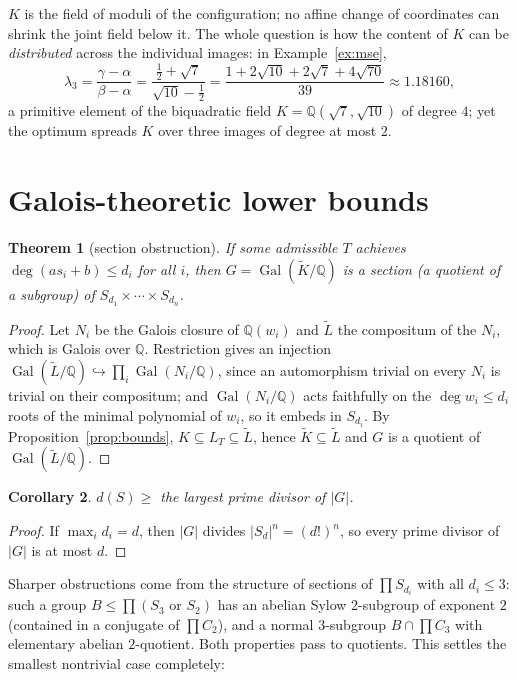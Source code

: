 \documentclass[11pt]{article}
\newtheorem{theorem}{Theorem}
\newtheorem{corollary}[theorem]{Corollary}
\theoremstyle{definition}
\theoremstyle{remark}
\newcommand{\Q}{\mathbb{Q}}
\newcommand{\Gal}{\operatorname{Gal}}
\newcommand{\Kt}{\widetilde{K}}
\begin{document}
$K$ is the field of moduli of the configuration; no affine change of coordinates can shrink
the joint field below it. The whole question is how the content of $K$ can be \emph{distributed}
across the individual images: in Example~\ref{ex:mse},
\begin{equation}\label{eq:lambda}
\lambda_3
= \frac{\gamma - \alpha}{\beta - \alpha}
= \frac{\tfrac12 + \sqrt7}{\sqrt{10} - \tfrac12}
= \frac{1 + 2\sqrt{10} + 2\sqrt7 + 4\sqrt{70}}{39}
\approx 1.18160,
\end{equation}
a primitive element of the biquadratic field $K = \Q(\sqrt7, \sqrt{10})$ of degree $4$; yet
the optimum spreads $K$ over three images of degree at most $2$.

\section{Galois-theoretic lower bounds}\label{sec:lower}

\begin{theorem}[section obstruction]\label{thm:section}
If some admissible $T$ achieves $\deg(a s_i + b) \le d_i$ for all $i$, then $G = \Gal(\Kt/\Q)$
is a \emph{section} (a quotient of a subgroup) of $S_{d_1} \times \cdots \times S_{d_n}$.
\end{theorem}

\begin{proof}
Let $N_i$ be the Galois closure of $\Q(w_i)$ and $\widetilde L$ the compositum of the $N_i$,
which is Galois over $\Q$. Restriction gives an injection
$\Gal(\widetilde L/\Q) \hookrightarrow \prod_i \Gal(N_i/\Q)$, since an automorphism trivial on
every $N_i$ is trivial on their compositum; and $\Gal(N_i/\Q)$ acts faithfully on the
$\deg w_i \le d_i$ roots of the minimal polynomial of $w_i$, so it embeds in $S_{d_i}$. By
Proposition~\ref{prop:bounds}, $K \subseteq L_T \subseteq \widetilde L$, hence
$\Kt \subseteq \widetilde L$ and $G$ is a quotient of $\Gal(\widetilde L/\Q)$.
\end{proof}

\begin{corollary}\label{cor:prime}
$d(S) \ge$ the largest prime divisor of $|G|$.
\end{corollary}

\begin{proof}
If $\max_i d_i = d$, then $|G|$ divides $|S_d|^n = (d!)^n$, so every prime divisor of $|G|$ is
at most $d$.
\end{proof}

Sharper obstructions come from the structure of sections of $\prod S_{d_i}$ with all
$d_i \le 3$: such a group $B \le \prod (S_3 \text{ or } S_2)$ has an abelian Sylow
$2$-subgroup of exponent $2$ (contained in a conjugate of $\prod C_2$), and a normal
$3$-subgroup $B \cap \prod C_3$ with elementary abelian $2$-quotient. Both properties pass to
quotients. This settles the smallest nontrivial case completely:
\end{document}
